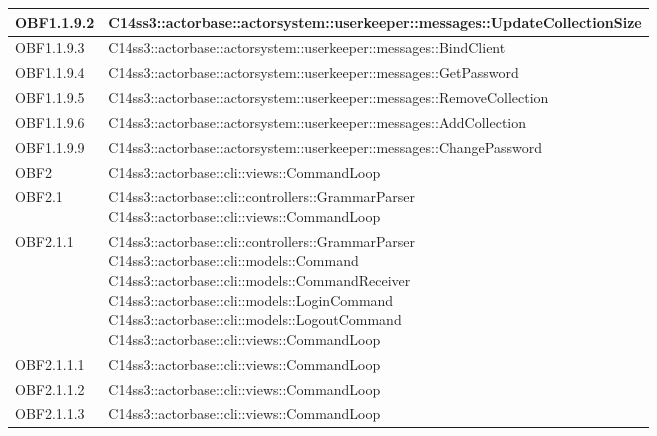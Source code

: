 \documentclass{scalatekids-article}
\begin{document}
\begin{longtable}[H]{|p{4.5cm}|p{13cm}|}
\hline
OBF1.1.9.2 & \multiLineCell[t]{C14ss3::actorbase::actorsystem::userkeeper::messages::UpdateCollectionSize\\}\\
\hline
OBF1.1.9.3 & \multiLineCell[t]{C14ss3::actorbase::actorsystem::userkeeper::messages::BindClient\\}\\
\hline
OBF1.1.9.4 & \multiLineCell[t]{C14ss3::actorbase::actorsystem::userkeeper::messages::GetPassword\\}\\
\hline
OBF1.1.9.5 & \multiLineCell[t]{C14ss3::actorbase::actorsystem::userkeeper::messages::RemoveCollection\\}\\
\hline
OBF1.1.9.6 & \multiLineCell[t]{C14ss3::actorbase::actorsystem::userkeeper::messages::AddCollection\\}\\
\hline
OBF1.1.9.9 & \multiLineCell[t]{C14ss3::actorbase::actorsystem::userkeeper::messages::ChangePassword\\}\\
\hline
OBF2 & \multiLineCell[t]{C14ss3::actorbase::cli::views::CommandLoop\\}\\
\hline
OBF2.1 & \multiLineCell[t]{C14ss3::actorbase::cli::controllers::GrammarParser\\C14ss3::actorbase::cli::views::CommandLoop\\}\\
\hline
OBF2.1.1 & \multiLineCell[t]{C14ss3::actorbase::cli::controllers::GrammarParser\\C14ss3::actorbase::cli::models::Command\\C14ss3::actorbase::cli::models::CommandReceiver\\C14ss3::actorbase::cli::models::LoginCommand\\C14ss3::actorbase::cli::models::LogoutCommand\\C14ss3::actorbase::cli::views::CommandLoop\\}\\
\hline
OBF2.1.1.1 & \multiLineCell[t]{C14ss3::actorbase::cli::views::CommandLoop\\}\\
\hline
OBF2.1.1.2 & \multiLineCell[t]{C14ss3::actorbase::cli::views::CommandLoop\\}\\
\hline
OBF2.1.1.3 & \multiLineCell[t]{C14ss3::actorbase::cli::views::CommandLoop\\}\\

\end{longtable}
\end{document}
